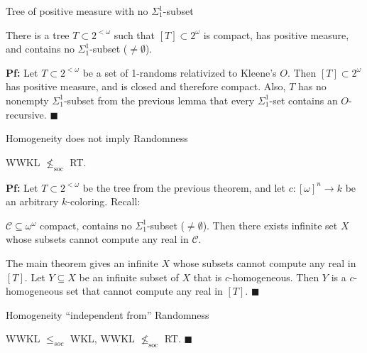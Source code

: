 \begin{frame}{Tree of positive measure with no $\Sigma_1^1$-subset}
  \begin{thm}
    There is a tree $T\subset2^{<\omega}$ such that $[T]\subset
    2^\omega$ is compact, has positive measure, and contains no
    $\Sigma_1^1$-subset ($\neq\emptyset$).
  \end{thm}

  \vspace{2em}
  \textbf{Pf:} Let $T\subset2^{<\omega}$ be a set of 1-randoms relativized
  to Kleene's $O$. Then $[T]\subset 2^\omega$ has positive measure, and is
  closed and therefore compact. Also, $T$ has no nonempty
  $\Sigma_1^1$-subset from the previous lemma that every $\Sigma^1_1$-set
  contains an $O$-recursive. $\blacksquare$
\end{frame}

\begin{frame}{Homogeneity does not imply Randomness}
  \begin{theorem}
    WWKL $\nleq_{\text{soc}}$ RT.
  \end{theorem}

  \vspace{1em}
  \textbf{Pf:} Let $T\subset2^{<\omega}$ be the tree from the previous
  theorem, and let $c:[\omega]^n\rightarrow k$ be an arbitrary
  $k$-coloring. Recall:
  \begin{main-thm*}
    $\mathcal{C}\subseteq\omega^\omega$ compact, contains no
    $\Sigma_1^1$-subset ($\neq\emptyset$). Then there exists infinite set
    $X$ whose subsets cannot compute any real in $\mathcal{C}$.
  \end{main-thm*}

  \vspace{1em}
  The main theorem gives an infinite $X$ whose subsets cannot compute any
  real in $[T]$. Let $Y\subseteq X$ be an infinite subset of $X$ that is
  $c$-homogeneous. Then $Y$ is a $c$-homogeneous set that cannot compute
  any real in $[T]$. $\blacksquare$
\end{frame}

\begin{frame}{Homogeneity ``independent from'' Randomness}
  \begin{coro}
    WWKL $\leq_{soc}$ WKL, WWKL $\nleq_{\text{soc}}$ RT. $\blacksquare$
  \end{coro}

  \vspace{2em}
  \begin{center}
  \end{center}
\end{frame}
